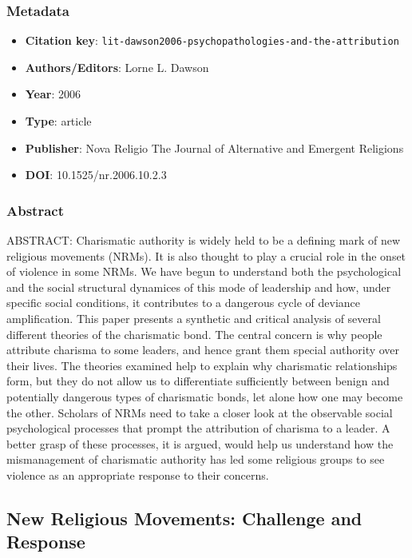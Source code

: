 \subsubsection*{Metadata}
\begin{itemize}
  \item \textbf{Citation key}: \texttt{lit-dawson2006-psychopathologies-and-the-attribution}
  \item \textbf{Authors/Editors}: Lorne L. Dawson
  \item \textbf{Year}: 2006
  \item \textbf{Type}: article
  \item \textbf{Publisher}: Nova Religio The Journal of Alternative and Emergent Religions
  \item \textbf{DOI}: 10.1525/nr.2006.10.2.3
\end{itemize}
\subsubsection*{Abstract}
ABSTRACT: Charismatic authority is widely held to be a defining mark of new religious movements (NRMs). It is also thought to play a crucial role in the onset of violence in some NRMs. We have begun to understand both the psychological and the social structural dynamices of this mode of leadership and how, under specific social conditions, it contributes to a dangerous cycle of deviance amplification. This paper presents a synthetic and critical analysis of several different theories of the charismatic bond. The central concern is why people attribute charisma to some leaders, and hence grant them special authority over their lives. The theories examined help to explain why charismatic relationships form, but they do not allow us to differentiate sufficiently between benign and potentially dangerous types of charismatic bonds, let alone how one may become the other. Scholars of NRMs need to take a closer look at the observable social psychological processes that prompt the attribution of charisma to a leader. A better grasp of these processes, it is argued, would help us understand how the mismanagement of charismatic authority has led some religious groups to see violence as an appropriate response to their concerns.

\subsection{New Religious Movements: Challenge and Response}\label{lit:lit-hexham2001-new-religious-movements-challenge}
